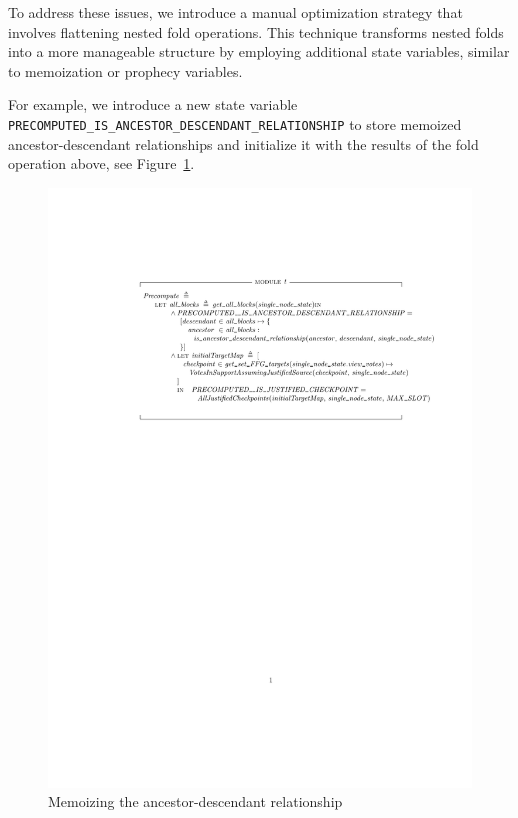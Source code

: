 To address these issues, we introduce a manual optimization strategy that
involves flattening nested fold operations. This technique transforms nested
folds into a more manageable structure by employing additional \tlap{} state
variables, similar to memoization or prophecy variables.

For example, we introduce a new \tlap{} state variable
\texttt{PRECOMPUTED\_IS\_ANCESTOR\_DESCENDANT\_RELATIONSHIP} to store
memoized ancestor-descendant relationships and initialize it with the results
of the fold operation above, see Figure~\ref{fig:relationship-memo}.

\begin{figure}
  \includegraphics[width=\textwidth]{images/precompute.pdf}
  \caption{Memoizing the ancestor-descendant relationship}%
  \label{fig:relationship-memo}
\end{figure}

